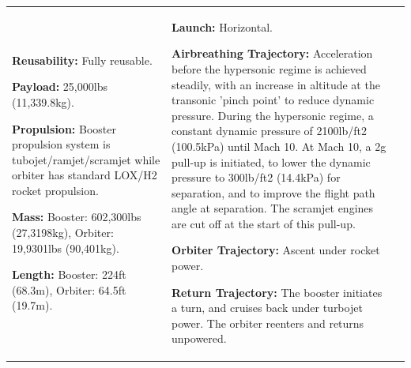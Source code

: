 {\begin{landscape}
\begin{xltabular}{\linewidth}{|X|X|X|}
	\textbf{Reusability:} Fully reusable.
	
	\textbf{Payload:} 25,000lbs (11,339.8kg).
	
	\textbf{Propulsion:} Booster propulsion system is tubojet/ramjet/scramjet while orbiter has standard LOX/H2 rocket propulsion. 
	
	\textbf{Mass:} Booster: 602,300lbs (27,3198kg), Orbiter: 19,9301lbs (90,401kg).
	
	\textbf{Length:} Booster: 224ft (68.3m), Orbiter: 64.5ft (19.7m).
	&\small
	
	\textbf{Launch:} Horizontal.
	
	\textbf{Airbreathing Trajectory:} Acceleration before the hypersonic regime is achieved steadily, with an increase in altitude at the transonic 'pinch point' to reduce dynamic pressure. 
	During the hypersonic regime, a constant dynamic pressure of 2100lb/ft2 (100.5kPa) until Mach 10.
	At Mach 10, a 2g pull-up is initiated, to lower the dynamic pressure to 300lb/ft2 (14.4kPa) for separation, and to improve the flight path angle at separation. The scramjet engines are cut off at the start of this pull-up.  
	
	\textbf{Orbiter Trajectory:} Ascent under rocket power. 
	
	\textbf{Return Trajectory:} The booster initiates a turn, and cruises back under turbojet power. 
	The orbiter reenters and returns unpowered. 
	

\end{xltabular}
\end{landscape}}
